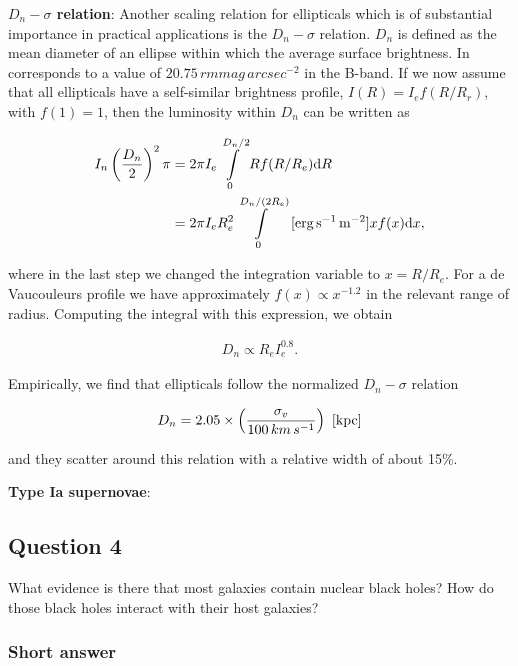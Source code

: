 \documentclass[a4paper,11pt]{article}
\begin{document}
{\noindent}\textbf{$D_n-\sigma$ relation}: Another scaling relation for ellipticals which is of substantial importance in practical applications is the $D_n-\sigma$ relation. $D_n$ is defined as the mean diameter of an ellipse within which the average surface brightness. In corresponds to a value of $20.75\,{rm mag\,arcsec^{-2}}$ in the B-band. If we now assume that all ellipticals have a self-similar brightness profile, $I(R)=I_ef(R/R_r)$, with $f(1)=1$, then the luminosity within $D_n$ can be written as

\begin{align*}
    I_n\left(\frac{D_n}{2}\right)^2\pi &= 2\pi I_e \int\limits_0^{D_n/2} Rf(R/R_e)\mathrm{d}R \\
    &= 2\pi I_eR_e^2 \int\limits_0^{D_n/(2R_e)} ~ [{\rm erg\,s^{-1}\,m^{-2}}] xf(x)\mathrm{d}x,
\end{align*}

{\noindent}where in the last step we changed the integration variable to $x=R/R_e$. For a de Vaucouleurs profile we have approximately $f(x)\propto x^{-1.2}$ in the relevant range of radius. Computing the integral with this expression, we obtain

\begin{align*}
    D_n \propto R_eI_e^{0.8}.
\end{align*}

{\noindent}Empirically, we find that ellipticals follow the normalized $D_n-\sigma$ relation

\begin{align*}
    D_n = 2.05\times\left(\frac{\sigma_v}{100\,km\,s^{-1}}\right) ~ [{\rm kpc}]
\end{align*}

{\noindent}and they scatter around this relation with a relative width of about 15\%.

{\noindent}\textbf{Type Ia supernovae}: 



\newpage
\subsection{Question 4}

What evidence is there that most galaxies contain nuclear black holes? How do those black holes interact with their host galaxies?

\subsubsection{Short answer}
\end{document}
